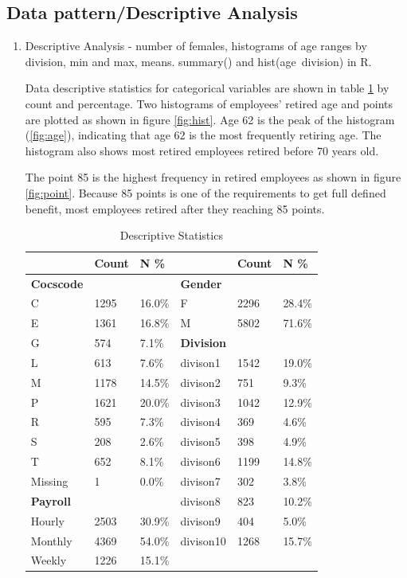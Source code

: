 \documentclass[12pt,letterpaper]{article}
\begin{document}
\subsection{Data pattern/Descriptive Analysis}
\begin{enumerate}

\item Descriptive Analysis - number of females, histograms of age ranges by division, min and max, means.  summary() and hist(age~division) in R.

Data descriptive statistics for categorical variables are shown in table \ref{tab:descriptive} by count and percentage. 
Two histograms of employees' retired age and points are plotted as shown in figure \ref{fig:hist}. 
Age 62 is the peak of the histogram (\ref{fig:age}), indicating that age 62 is the most frequently retiring age. The histogram also shows most retired employees retired before 70 years old. 

The point 85 is the highest frequency in retired employees as shown in figure \ref{fig:point}. Because 85 points is one of the requirements to get full defined benefit, most employees retired after they reaching 85 points.  

\begin{table}[htbp]
	\centering
	\scriptsize
	\caption{Descriptive Statistics}
	\begin{tabular}{lll||lll}
		\toprule
		& Count & N \%  &       & Count & N \% \\
		\midrule
		\textbf{Cocscode} &       &       & \textbf{Gender} &       &  \\
		C     & 1295  & 16.0\% & F     & 2296  & 28.4\% \\
		E     & 1361  & 16.8\% & M     & 5802  & 71.6\% \\
		G     & 574   & 7.1\% & \textbf{Division} &       &  \\
		L     & 613   & 7.6\% & divison1 & 1542  & 19.0\% \\
		M     & 1178  & 14.5\% & divison2 & 751   & 9.3\% \\
		P     & 1621  & 20.0\% & divison3 & 1042  & 12.9\% \\
		R     & 595   & 7.3\% & divison4 & 369   & 4.6\% \\
		S     & 208   & 2.6\% & divison5 & 398   & 4.9\% \\
		T     & 652   & 8.1\% & divison6 & 1199  & 14.8\% \\
		Missing & 1     & 0.0\% & divison7 & 302   & 3.8\% \\
		\textbf{Payroll} &       &       & divison8 & 823   & 10.2\% \\
		Hourly & 2503  & 30.9\% & divison9 & 404   & 5.0\% \\
		Monthly & 4369  & 54.0\% & divison10 & 1268  & 15.7\% \\
		Weekly & 1226  & 15.1\% &       &       &  \\
		\bottomrule
	\end{tabular}%
	\label{tab:descriptive}%
\end{table}%



\end{enumerate}
\end{document}
